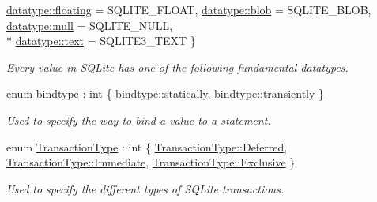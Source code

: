 \begin{DoxyCompactItemize}
\hyperlink{a00038_a7467e5cdd32bbf7fce35aced88682dc0a374515b23d6f106696387776a6077d17}{datatype\-::floating} = S\-Q\-L\-I\-T\-E\-\_\-\-F\-L\-O\-A\-T, 
\hyperlink{a00038_a7467e5cdd32bbf7fce35aced88682dc0aee26908bf9629eeb4b37dac350f4754a}{datatype\-::blob} = S\-Q\-L\-I\-T\-E\-\_\-\-B\-L\-O\-B, 
\hyperlink{a00038_a7467e5cdd32bbf7fce35aced88682dc0a37a6259cc0c1dae299a7866489dff0bd}{datatype\-::null} = S\-Q\-L\-I\-T\-E\-\_\-\-N\-U\-L\-L, 
\\*
\hyperlink{a00038_a7467e5cdd32bbf7fce35aced88682dc0a1cb251ec0d568de6a929b520c4aed8d1}{datatype\-::text} = S\-Q\-L\-I\-T\-E3\-\_\-\-T\-E\-X\-T
 \}
\begin{DoxyCompactList}\small\item\em Every value in S\-Q\-Lite has one of the following fundamental datatypes. \end{DoxyCompactList}\item 
enum \hyperlink{a00038_ae6a0fc429d821cca9a1b01d36cb0991d}{bindtype} \-: int \{ \hyperlink{a00038_ae6a0fc429d821cca9a1b01d36cb0991da29adf7ed88000fbb825808cb1d3667fa}{bindtype\-::statically}, 
\hyperlink{a00038_ae6a0fc429d821cca9a1b01d36cb0991dad51ecd4c7c8454ddc870989523c01d4b}{bindtype\-::transiently}
 \}
\begin{DoxyCompactList}\small\item\em Used to specify the way to bind a value to a statement. \end{DoxyCompactList}\item 
enum \hyperlink{a00038_aea994c2d3b1e9448cd9c526b44f78890}{Transaction\-Type} \-: int \{ \hyperlink{a00038_aea994c2d3b1e9448cd9c526b44f78890a4ed71db54748b36eeb398876b0c747ac}{Transaction\-Type\-::\-Deferred}, 
\hyperlink{a00038_aea994c2d3b1e9448cd9c526b44f78890a43f6615bbb2c40a5306ff804094420b1}{Transaction\-Type\-::\-Immediate}, 
\hyperlink{a00038_aea994c2d3b1e9448cd9c526b44f78890a2ef50b4c466304dc6ac77bac8a779971}{Transaction\-Type\-::\-Exclusive}
 \}
\begin{DoxyCompactList}\small\item\em Used to specify the different types of S\-Q\-Lite transactions. \end{DoxyCompactList}\end{DoxyCompactItemize}
